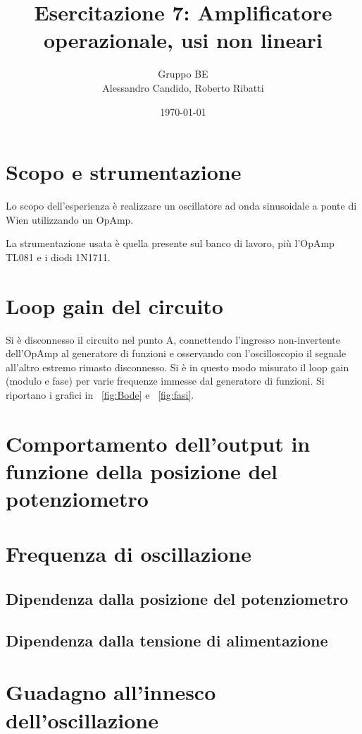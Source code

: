 \documentclass[10pt,a4paper]{article}
\title{Esercitazione 7: Amplificatore operazionale, usi non lineari}
\author{Gruppo BE \\ Alessandro Candido, Roberto Ribatti}
\date{\today}
\begin{document}
\maketitle

\section{Scopo e strumentazione}
Lo scopo dell'esperienza è realizzare un oscillatore ad onda sinusoidale a ponte di Wien utilizzando un OpAmp.

La strumentazione usata è quella presente sul banco di lavoro, più l'OpAmp TL081 e i diodi 1N1711.

\section{Loop gain del circuito}
Si è disconnesso il circuito nel punto A, connettendo l'ingresso non-invertente dell'OpAmp al generatore di funzioni e osservando con l'oscilloscopio il segnale all'altro estremo rimasto disconnesso.
Si è in questo modo misurato il loop gain (modulo e fase) per varie frequenze immesse dal generatore di funzioni. Si riportano i grafici in \figurename{~\ref{fig:Bode}} e \figurename{~\ref{fig:fasi}}.

\section{Comportamento dell'output in funzione della posizione del potenziometro}

\section{Frequenza di oscillazione}

\subsection{Dipendenza dalla posizione del potenziometro}

\subsection{Dipendenza dalla tensione di alimentazione}

\section{Guadagno all'innesco dell'oscillazione}
\end{document}
